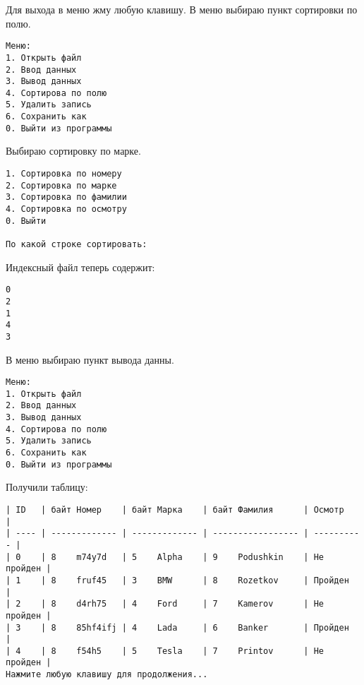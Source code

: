 Для выхода в меню жму любую клавишу. В меню выбираю пункт сортировки по полю.

\begin{tcolorbox}
\begin{verbatim}
Меню:
1. Открыть файл
2. Ввод данных       
3. Вывод данных      
4. Сортирова по полю 
5. Удалить запись    
6. Сохранить как     
0. Выйти из программы
\end{verbatim}
\end{tcolorbox}

Выбираю сортировку по марке.

\begin{tcolorbox}
\begin{verbatim}
1. Сортировка по номеру
2. Сортировка по марке 
3. Сортировка по фамилии
4. Сортировка по осмотру     
0. Выйти

По какой строке сортировать: 
\end{verbatim}
\end{tcolorbox}

Индексный файл теперь содержит:

\begin{tcolorbox}
\begin{verbatim}
0
2
1
4
3
\end{verbatim}
\end{tcolorbox}

В меню выбираю пункт вывода данны.

\begin{tcolorbox}
\begin{verbatim}
Меню:
1. Открыть файл
2. Ввод данных       
3. Вывод данных      
4. Сортирова по полю 
5. Удалить запись    
6. Сохранить как     
0. Выйти из программы
\end{verbatim}
\end{tcolorbox}

Получили таблицу:

\begin{tcolorbox}
\begin{verbatim}
| ID   | байт Номер    | байт Марка    | байт Фамилия      | Осмотр     | 
| ---- | ------------- | ------------- | ----------------- | ---------- | 
| 0    | 8    m74y7d   | 5    Alpha    | 9    Podushkin    | Не пройден | 
| 1    | 8    fruf45   | 3    BMW      | 8    Rozetkov     | Пройден    | 
| 2    | 8    d4rh75   | 4    Ford     | 7    Kamerov      | Не пройден | 
| 3    | 8    85hf4ifj | 4    Lada     | 6    Banker       | Пройден    | 
| 4    | 8    f54h5    | 5    Tesla    | 7    Printov      | Не пройден | 
Нажмите любую клавишу для продолжения...
\end{verbatim}
\end{tcolorbox}

